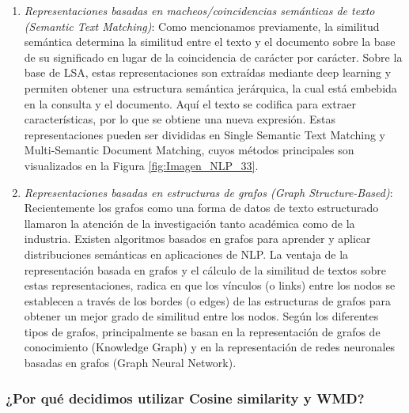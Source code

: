 \documentclass[12pt,a4paper]{article}
\begin{document}
\begin{sloppypar}
\begin{enumerate}
\item \textit{Representaciones basadas en macheos/coincidencias semánticas de texto (Semantic Text Matching)}: Como mencionamos previamente, la similitud semántica determina la similitud entre el texto y el documento sobre la base de su significado en lugar de la coincidencia de carácter por carácter. Sobre la base de LSA, estas representaciones son extraídas mediante deep learning y permiten obtener una estructura semántica jerárquica, la cual está embebida en la consulta y el documento. Aquí el texto se codifica para extraer características, por lo que se obtiene una nueva expresión. Estas representaciones pueden ser divididas en Single Semantic Text Matching y Multi-Semantic Document Matching, cuyos métodos principales son visualizados en la Figura \ref{fig:Imagen_NLP_33}.

\item \textit{Representaciones basadas en estructuras de grafos (Graph Structure-Based)}: Recientemente los grafos como una forma de datos de texto estructurado llamaron la atención de la investigación tanto académica como de la industria. Existen algoritmos basados en grafos para aprender y aplicar distribuciones semánticas en aplicaciones de NLP. La ventaja de la representación basada en grafos y el cálculo de la similitud de textos sobre estas representaciones, radica en que los vínculos (o links) entre los nodos se establecen a través de los bordes (o edges) de las estructuras de grafos para obtener un mejor grado de similitud entre los nodos. Según los diferentes tipos de grafos, principalmente se basan en la representación de grafos de conocimiento (Knowledge Graph) y en la representación de redes neuronales basadas en grafos (Graph Neural Network).
\\
\end{enumerate}

\subsubsection{¿Por qué decidimos utilizar Cosine similarity y WMD?}\label{cos_y_wmd}


\end{sloppypar}
\end{document}
